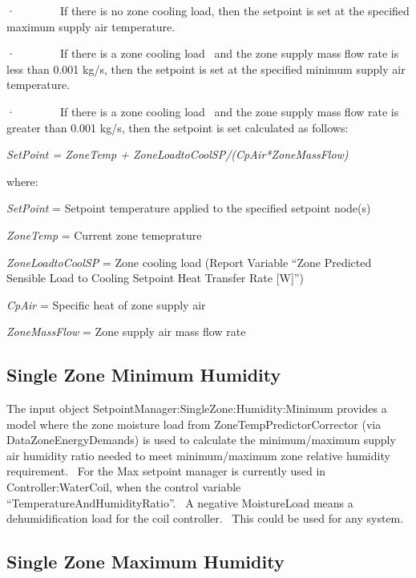 ·~~~~~~~~If there is no zone cooling load, then the setpoint is set at the specified maximum supply air temperature.

·~~~~~~~~If there is a zone cooling load~ and the zone supply mass flow rate is less than 0.001 kg/s, then the setpoint is set at the specified minimum supply air temperature.

·~~~~~~~~If there is a zone cooling load~ and the zone supply mass flow rate is greater than 0.001 kg/s, then the setpoint is set calculated as follows:

\emph{SetPoint = ZoneTemp + ZoneLoadtoCoolSP/(CpAir*ZoneMassFlow)}

where:

\emph{SetPoint} = Setpoint temperature applied to the specified setpoint node(s)

\emph{ZoneTemp} = Current zone temeprature

\emph{ZoneLoadtoCoolSP} = Zone cooling load (Report Variable ``Zone Predicted Sensible Load to Cooling Setpoint Heat Transfer Rate {[}W{]}'')

\emph{CpAir} = Specific heat of zone supply air

\emph{ZoneMassFlow} = Zone supply air mass flow rate

\subsection{Single Zone Minimum Humidity}\label{single-zone-minimum-humidity}

The input object SetpointManager:SingleZone:Humidity:Minimum provides a model where the zone moisture load from ZoneTempPredictorCorrector (via DataZoneEnergyDemands) is used to calculate the minimum/maximum supply air humidity ratio needed to meet minimum/maximum zone relative humidity requirement.~ For the Max setpoint manager is currently used in Controller:WaterCoil, when the control variable ``TemperatureAndHumidityRatio''.~ A negative MoistureLoad means a dehumidification load for the coil controller.~ This could be used for any system.

\subsection{Single Zone Maximum Humidity}\label{single-zone-maximum-humidity}

